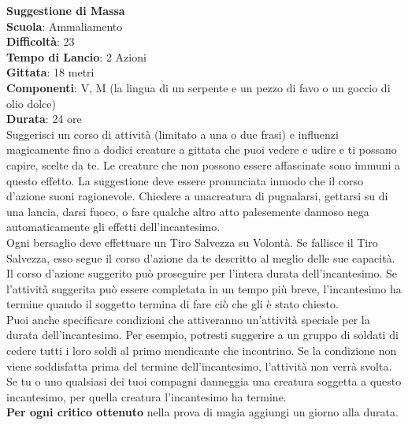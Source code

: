 \begin{multicols}{2}
\medskip\textbf{Suggestione di Massa}\\
\textbf{Scuola}: Ammaliamento\\
\textbf{Difficoltà}:  23\\
\textbf{Tempo di Lancio}: 2 Azioni\\
\textbf{Gittata}: 18 metri\\
\textbf{Componenti}: V, M (la lingua di un serpente e un pezzo di favo o un goccio di olio dolce)\\
\textbf{Durata}: 24 ore\\
Suggerisci un corso di attività (limitato a una o due frasi) e influenzi magicamente fino a dodici creature a gittata che puoi vedere e udire e ti possano capire, scelte da te. Le creature che non possono essere affascinate sono immuni a questo effetto. La suggestione deve essere pronunciata inmodo che il  corso d’azione suoni ragionevole. Chiedere a unacreatura di pugnalarsi, gettarsi su  di una lancia, darsi fuoco, o fare qualche altro atto palesemente dannoso nega automaticamente gli effetti dell'incantesimo.\\
Ogni bersaglio deve effettuare un Tiro Salvezza su Volontà. Se fallisce il Tiro Salvezza, esso segue il corso d’azione da te descritto al meglio delle sue capacità. Il corso d’azione suggerito può proseguire per l’intera durata dell'incantesimo. Se l’attività suggerita può essere completata in un tempo più breve, l'incantesimo ha termine quando il soggetto termina di fare ciò che gli è stato chiesto.\\
Puoi anche specificare condizioni che attiveranno un'attività speciale per la durata dell'incantesimo. Per esempio, potresti suggerire a un gruppo di soldati di cedere tutti i loro soldi al primo mendicante che incontrino. Se la condizione non viene soddisfatta prima del termine dell'incantesimo, l’attività non verrà svolta. Se tu o uno qualsiasi dei tuoi compagni danneggia una creatura soggetta a questo incantesimo, per quella creatura l'incantesimo ha termine.\\
\textbf{Per ogni critico ottenuto} nella prova di magia aggiungi un giorno alla durata.


\end{multicols}
